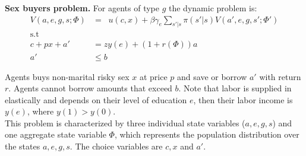 \noindent \textbf{Sex buyers problem.} For agents of type $g$ the dynamic problem is:
\begin{align}
V(a,e,g,s;\Phi) &= \mathop{\max_{c\geq 0,x \geq 0,a' \geq 0}}  u(c,x) + \beta \gamma_{e} \sum_{s'|s}\pi(s'|s)V(a',e,g,s';\Phi') \label{eq1}\\
\mbox{s.t}\nonumber\\
c+ px +a'&= zy(e) + (1+r(\Phi))a \label{eq2}\\
a' &\leq b
\end{align}

 Agents buys non-marital risky sex $x$ at price $p$ and save or borrow $a'$ with return $r$. Agents cannot borrow amounts that exceed $b$. Note that labor is supplied in elastically and depends on their level of education $e$, then their labor income is $y(e)$, where $y(1)>y(0)$.\\
 This problem is characterized by three individual state variables ($a,e,g,s$) and one aggregate state variable $\Phi$, which represents the population distribution over the states $a,e,g,s$. The choice variables are $c,x$ and $a'$.\\

